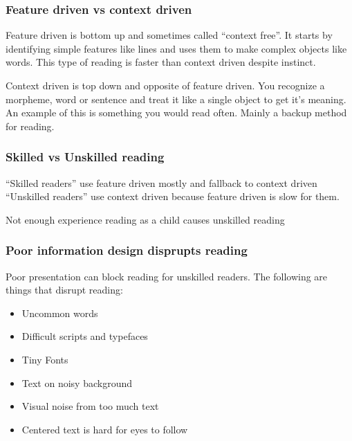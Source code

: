 \documentclass[11pt,]{article}
\providecommand{\tightlist}{%
  \setlength{\itemsep}{0pt}\setlength{\parskip}{0pt}}
\begin{document}
\hypertarget{feature-driven-vs-context-driven}{%
\subsubsection{Feature driven vs context
driven}\label{feature-driven-vs-context-driven}}

Feature driven is bottom up and sometimes called ``context free''. It
starts by identifying simple features like lines and uses them to make
complex objects like words. This type of reading is faster than context
driven despite instinct.

Context driven is top down and opposite of feature driven. You recognize
a morpheme, word or sentence and treat it like a single object to get
it's meaning. An example of this is something you would read often.
Mainly a backup method for reading.

\hypertarget{skilled-vs-unskilled-reading}{%
\subsubsection{Skilled vs Unskilled
reading}\label{skilled-vs-unskilled-reading}}

``Skilled readers'' use feature driven mostly and fallback to context
driven ``Unskilled readers'' use context driven because feature driven
is slow for them.

Not enough experience reading as a child causes unskilled reading

\hypertarget{poor-information-design-disprupts-reading}{%
\subsubsection{Poor information design disprupts
reading}\label{poor-information-design-disprupts-reading}}

Poor presentation can block reading for unskilled readers. The following
are things that disrupt reading:

\begin{itemize}
\tightlist
\item
  Uncommon words
\item
  Difficult scripts and typefaces
\item
  Tiny Fonts
\item
  Text on noisy background
\item
  Visual noise from too much text
\item
  Centered text is hard for eyes to follow
\end{itemize}
\end{document}
